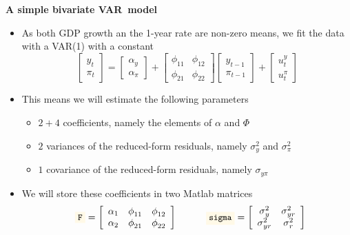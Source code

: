 
\begin{frame}
{\textbf{A simple bivariate VAR\ model}}\medskip 

\begin{itemize}
\item As both GDP growth an the 1-year rate are non-zero means, we fit the
data with a VAR(1) with a constant\medskip 
\begin{equation*}
\begin{bmatrix}
y_{t} \\ 
\pi _{t}%
\end{bmatrix}%
=%
\begin{bmatrix}
\alpha _{y} \\ 
\alpha _{\pi }%
\end{bmatrix}%
+\left[ 
\begin{array}{cc}
\phi _{11} & \phi _{12} \\ 
\phi _{21} & \phi _{22}%
\end{array}%
\right] 
\begin{bmatrix}
y_{t-1} \\ 
\pi _{t-1}%
\end{bmatrix}%
+%
\begin{bmatrix}
u_{t}^{y} \\ 
u_{t}^{\pi }%
\end{bmatrix}%
\end{equation*}%
\bigskip

\item This means we will estimate the following parameters\smallskip

\begin{itemize}
\item $2+4$ coefficients, namely the elements of $\alpha $ and $\Phi $%
\medskip

\item $2$ variances of the reduced-form residuals, namely $\sigma _{y}^{2}$
and $\sigma _{\pi }^{2}$\medskip

\item $1$ covariance of the reduced-form residuals, namely $\sigma _{y\pi }$%
\bigskip \smallskip
\end{itemize}

\item We will store these coefficients in two Matlab matrices\medskip 
\begin{equation*}
\text{\colorbox{script!80}{\small\texttt{F}}}=\left[ 
\begin{array}{ccc}
\alpha _{1} & \phi _{11} & \phi _{12} \\ 
\alpha _{2} & \phi _{21} & \phi _{22}%
\end{array}%
\right] \ \ \ \ \ \ \ \text{\colorbox{script!80}{\small\texttt{sigma}}}=%
\left[ 
\begin{array}{cc}
\sigma _{y}^{2} & \sigma _{yr}^{2} \\ 
\sigma _{yr}^{2} & \sigma _{r}^{2}%
\end{array}%
\right]
\end{equation*}
\end{itemize}
\end{frame}


